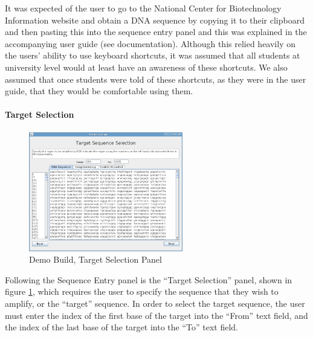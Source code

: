 It was expected of the user to go to the National Center for
Biotechnology Information \cite{ncbi} website and obtain a DNA sequence by
copying it to their clipboard and then pasting this into the sequence
entry panel and this was explained in the accompanying user guide (see
documentation).
Although this relied heavily on the users' ability to use keyboard
shortcuts, it was assumed that all students at university level would
at least have an awareness of these shortcuts.
We also assumed that once students were told of these shortcuts, as
they were in the user guide, that they would be comfortable using
them.


\paragraph{Target Selection}

\begin{figure}[!t]
  \begin{center}
    \includegraphics[width=0.6\textwidth]{./images/demoBuild/areaSelection.png}
    \caption{
      \label{fig:demoBuild:areaSelection}
      Demo Build, Target Selection Panel
    }
  \end{center}
\end{figure}

Following the Sequence Entry panel is the ``Target Selection'' panel,
shown in figure \ref{fig:demoBuild:areaSelection}, which requires the
user to specify the sequence that they wish to amplify, or the
``target'' sequence.
In order to select the target sequence, the user must enter the index
of the first base of the target into the ``From'' text field, and the
index of the last base of the target into the ``To'' text field.


